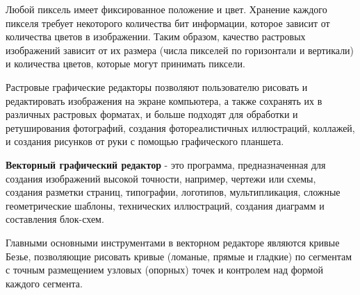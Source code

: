 Любой пиксель имеет фиксированное положение и цвет. Хранение каждого пикселя требует некоторого количества бит информации, которое зависит от количества цветов в изображении. Таким образом, качество растровых изображений зависит от их размера (числа пикселей по горизонтали и вертикали) и количества цветов, которые могут принимать пиксели.

Растровые графические редакторы позволяют пользователю рисовать и редактировать изображения на экране компьютера, а также сохранять их в различных растровых форматах, и больше подходят для обработки и ретуширования фотографий, создания фотореалистичных иллюстраций, коллажей, и создания рисунков от руки с помощью графического планшета.

\textbf{Векторный графический редактор} - это программа, предназначенная для создания изображений высокой точности, например, чертежи или схемы, создания разметки страниц, типографии, логотипов, мультипликация, сложные геометрические шаблоны, технических иллюстраций, создания диаграмм и составления блок-схем.

Главными основными инструментами в векторном редакторе являются кривые Безье, позволяющие рисовать кривые (ломаные, прямые и гладкие) по сегментам с точным размещением узловых (опорных) точек и контролем над формой каждого сегмента.

